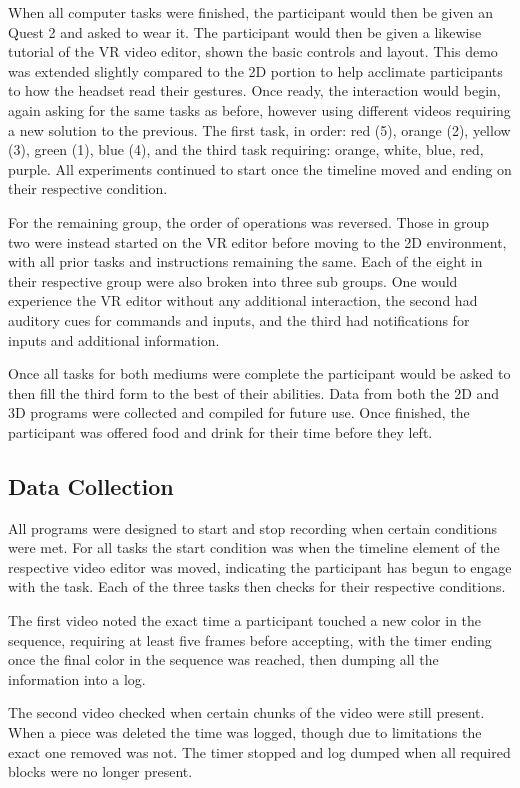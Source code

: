 \documentclass[manuscript, review]{acmart}
\begin{document}
When all computer tasks were finished, the participant would then be given an Quest 2 and asked to wear it. The participant would then be given a likewise tutorial of the VR video editor, shown the basic controls and layout. This demo was extended slightly compared to the 2D portion to help acclimate participants to how the headset read their gestures. Once ready, the interaction would begin, again asking for the same tasks as before, however using different videos requiring a new solution to the previous. The first task, in order: red (5), orange (2), yellow (3), green (1), blue (4), and the third task requiring: orange, white, blue, red, purple. All experiments continued to start once the timeline moved and ending on their respective condition.

For the remaining group, the order of operations was reversed. Those in group two were instead started on the VR editor before moving to the 2D environment, with all prior tasks and instructions remaining the same. Each of the eight in their respective group were also broken into three sub groups. One would experience the VR editor without any additional interaction, the second had auditory cues for commands and inputs, and the third had notifications for inputs and additional information.

Once all tasks for both mediums were complete the participant would be asked to then fill the third form to the best of their abilities. Data from both the 2D and 3D programs were collected and compiled for future use. Once finished, the participant was offered food and drink for their time before they left.

\subsection{Data Collection}

All programs were designed to start and stop recording when certain conditions were met. For all tasks the start condition was when the timeline element of the respective video editor was moved, indicating the participant has begun to engage with the task. Each of the three tasks then checks for their respective conditions.

The first video noted the exact time a participant touched a new color in the sequence, requiring at least five frames before accepting, with the timer ending once the final color in the sequence was reached, then dumping all the information into a log.

The second video checked when certain chunks of the video were still present. When a piece was deleted the time was logged, though due to limitations the exact one removed was not. The timer stopped and log dumped when all required blocks were no longer present.
\end{document}
